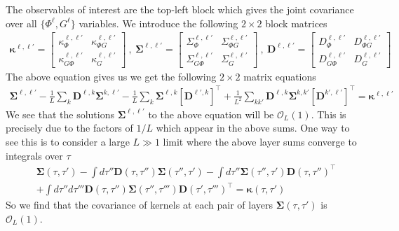\documentclass{article} %
\begin{document}
The observables of interest are the top-left block which gives the joint covariance over all $\{ \Phi^\ell, G^\ell \}$ variables. We introduce the following $2 \times 2$ block matrices
\begin{align}
    \bm\kappa^{\ell,\ell'} = 
    \begin{bmatrix}
        \kappa_{\Phi}^{\ell,\ell'} & \kappa_{\Phi G}^{\ell,\ell'}
        \\
        \kappa_{G \Phi}^{\ell,\ell'} & \kappa_{G}^{\ell,\ell'}
    \end{bmatrix}
    \ , \
    \bm\Sigma^{\ell,\ell'} = 
    \begin{bmatrix}
        \Sigma_{\Phi}^{\ell,\ell'} & \Sigma_{\Phi G}^{\ell,\ell'}
        \\
        \Sigma_{G \Phi}^{\ell,\ell'} & \Sigma_{G}^{\ell,\ell'}
    \end{bmatrix}
    \ , \ 
    \bm D^{\ell,\ell'} = 
    \begin{bmatrix}
        D_{\Phi}^{\ell,\ell'} & D_{\Phi G}^{\ell,\ell'}
        \\
        D_{G \Phi}^{\ell,\ell'} & D_{G}^{\ell,\ell'}
    \end{bmatrix}
\end{align}
The above equation gives us we get the following $2 \times 2$ matrix equations
\begin{align}
    \bm\Sigma^{\ell,\ell'} - \frac{1}{L} \sum_{k} \bm D^{\ell,k} \bm\Sigma^{k, \ell'} - \frac{1}{L} \sum_{k} \bm\Sigma^{\ell,k} [\bm D^{\ell',k}]^\top + \frac{1}{L^2} \sum_{k k'} \bm D^{\ell,k} \bm\Sigma^{k, k'} [\bm D^{k',\ell'}]^\top = \bm\kappa^{\ell,\ell'}
\end{align}
We see that the solutions $\bm\Sigma^{\ell,\ell'}$ to the above equation will be $\mathcal{O}_L(1)$. This is precisely due to the factors of $1/L$ which appear in the above sums. One way to see this is to consider a large $L \gg 1$ limit where the above layer sums converge to integrals over $\tau$
\begin{align}
    &\bm\Sigma(\tau,\tau') - \int d\tau'' \bm D(\tau,\tau'') \bm\Sigma(\tau'',\tau') -\int d\tau'' \bm\Sigma(\tau'',\tau') \bm D(\tau,\tau'')^\top  \nonumber
    \\
    &+ \int d\tau'' d\tau''' \bm D(\tau,\tau'') \bm\Sigma(\tau'',\tau''') \bm D(\tau',\tau''')^\top = \bm\kappa(\tau,\tau')
\end{align}
So we find that the covariance of kernels at each pair of layers $\bm\Sigma(\tau,\tau')$ is $\mathcal{O}_L(1)$. 
\end{document}
